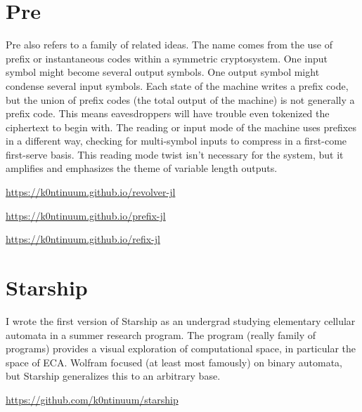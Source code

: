\documentclass{article}
\begin{document}
{{\section*{Pre}
Pre also refers to a family of related ideas. The name comes from the use of prefix or instantaneous codes within a symmetric cryptosystem. One input symbol might become several output symbols. One output symbol might condense several input symbols. Each state of the machine writes a prefix code, but the union of prefix codes (the total output of the machine) is not generally a prefix code. This means eavesdroppers will have trouble even tokenized the ciphertext to begin with. The reading or input mode of the machine uses prefixes in a different way, checking for multi-symbol inputs to compress in a first-come first-serve basis. This reading mode twist isn't necessary for the system, but it amplifies and emphasizes the theme of variable length outputs.  

\url{https://k0ntinuum.github.io/revolver-jl}

\url{https://k0ntinuum.github.io/prefix-jl}

\url{https://k0ntinuum.github.io/refix-jl}


\section*{Starship}

I wrote the first version of Starship as an undergrad studying elementary cellular automata in a summer research program. The program (really family of programs) provides a visual exploration of computational space, in particular the space of ECA. Wolfram focused (at least most famously) on binary automata, but Starship generalizes this to an arbitrary base.

\url{https://github.com/k0ntinuum/starship}










}}
\end{document}

